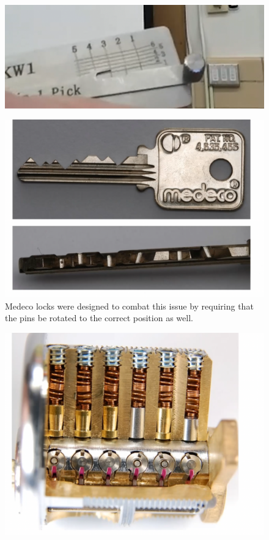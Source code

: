 \documentclass[../notes.tex]{subfiles}
\begin{document}
\begin{figure}[H]
    \centering
    \includegraphics[width=0.8\linewidth]{img/image_2023-04-16-21-01-34.png}
\end{figure}



\begin{figure}[H]
    \centering
    \includegraphics[width=0.8\linewidth]{img/image_2023-04-16-21-03-07.png}
    \caption{Medeco locks were designed to combat this issue by requiring that the pins be rotated to the correct position as well.}
\end{figure}

\begin{figure}[H]
    \centering
    \includegraphics[width=0.8\linewidth]{img/image_2023-04-16-21-03-41.png}
\end{figure}
\end{document}
